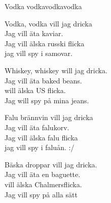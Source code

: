 \begin{song}{Vodka vodka}{vodkavodka}
\begin{vers}
Vodka, vodka vill jag dricka\\
Jag vill äta kaviar.\\
\repopen Jag vill älska russki flicka\\
jag vill spy i samovar. \repclose\\
\end{vers}
\begin{vers}
Whiskey, whiskey will jag dricka.\\
Jag vill äta baked beans.\\
\repopenJag will älska US flicka.\\
Jag will spy på mina jeans.\repclose\\
\end{vers}
\begin{vers}
Falu brännvin vill jag dricka\\
Jag vill äta falukorv.\\
\repopen Jag vill älska falu flicka   \\
jag vill spy i faluån. :/\\
\end{vers}
\begin{vers}
Bäska droppar vill jag dricka.\\
Jag vill äta en baguette.\\
\repopenJag vill älska Chalmersflicka.\\
Jag vill spy på alla sätt\repclose\\
\end{vers}
\end{song}
